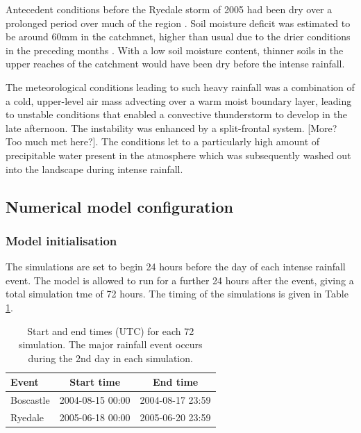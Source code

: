 Antecedent conditions before the Ryedale storm of 2005 had been dry over a prolonged period over much of the region \citep{sibley2009analysis}. Soil moisture deficit was estimated to be around 60mm in the catchmnet, higher than usual due to the drier conditions in the preceding months \citep{wass2008investigation}. With a low soil moisture content, thinner soils in the upper reaches of the catchment would have been dry before the intense rainfall.

The meteorological conditions leading to such heavy rainfall was a combination of a cold, upper-level air mass advecting over a warm moist boundary layer, leading to unstable conditions that enabled a convective thunderstorm to develop in the late afternoon. The instability was enhanced by a split-frontal system. [More? Too much met here?]. The conditions let to a particularly high amount of precipitable water present in the atmosphere which was subsequently washed out into the landscape during intense rainfall. 

\subsection{Numerical model configuration}

\subsubsection{Model initialisation}

The simulations are set to begin 24 hours before the day of each intense rainfall event. The model is allowed to run for a further 24 hours after the event, giving a total simulation tme of 72 hours. The timing of the simulations is given in Table \ref{table_start_time_hydrog_sims}.

\begin{table}[htbp]
\begin{tabular}{l c  c}
\textbf{Event}  &   \textbf{Start time} &  \textbf{End time} \\
\hline 
Boscastle          &  2004-08-15 00:00  &  2004-08-17 23:59 \\
Ryedale             &  2005-06-18 00:00  &  2005-06-20 23:59 \\

\end{tabular}
\caption{Start and end times (UTC) for each 72 simulation. The major rainfall event occurs during the 2nd day in each simulation.}
\label{table_start_time_hydrog_sims}
\end{table}

